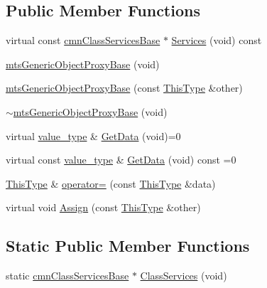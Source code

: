 \subsection*{Public Member Functions}
\begin{DoxyCompactItemize}
\item 
virtual const \hyperlink{classcmn_class_services_base}{cmn\+Class\+Services\+Base} $\ast$ \hyperlink{classmts_generic_object_proxy_base_a668f4395140c372201eb656664d4bfc3}{Services} (void) const 
\item 
\hyperlink{classmts_generic_object_proxy_base_aa831f498493fffb7f885a0ab0f2241dd}{mts\+Generic\+Object\+Proxy\+Base} (void)
\item 
\hyperlink{classmts_generic_object_proxy_base_aca3fa6198627eec09b0658a2e4d3a8a3}{mts\+Generic\+Object\+Proxy\+Base} (const \hyperlink{classmts_generic_object_proxy_base_adfa837044848485e7241e56816a74083}{This\+Type} \&other)
\item 
\hyperlink{classmts_generic_object_proxy_base_af159cf4b9332116312b0021396a8bf7f}{$\sim$mts\+Generic\+Object\+Proxy\+Base} (void)
\item 
virtual \hyperlink{classmts_generic_object_proxy_base_a82246d737da0e0bfb1710f63f6afa34b}{value\+\_\+type} \& \hyperlink{classmts_generic_object_proxy_base_a9d51847ed0c04af750b39c0d90945747}{Get\+Data} (void)=0
\item 
virtual const \hyperlink{classmts_generic_object_proxy_base_a82246d737da0e0bfb1710f63f6afa34b}{value\+\_\+type} \& \hyperlink{classmts_generic_object_proxy_base_a85594c5fb042f7b0432667893e745aa7}{Get\+Data} (void) const =0
\item 
\hyperlink{classmts_generic_object_proxy_base_adfa837044848485e7241e56816a74083}{This\+Type} \& \hyperlink{classmts_generic_object_proxy_base_a195e1cff25b666f995ca1e65df92b93e}{operator=} (const \hyperlink{classmts_generic_object_proxy_base_adfa837044848485e7241e56816a74083}{This\+Type} \&data)
\item 
virtual void \hyperlink{classmts_generic_object_proxy_base_a3bcbb45ef582c5bed7206d8752fa7a4a}{Assign} (const \hyperlink{classmts_generic_object_proxy_base_adfa837044848485e7241e56816a74083}{This\+Type} \&other)
\end{DoxyCompactItemize}
\subsection*{Static Public Member Functions}
\begin{DoxyCompactItemize}
\item 
static \hyperlink{classcmn_class_services_base}{cmn\+Class\+Services\+Base} $\ast$ \hyperlink{classmts_generic_object_proxy_base_a111e3d881829cbc1d2efc5feaf894aae}{Class\+Services} (void)
\end{DoxyCompactItemize}


